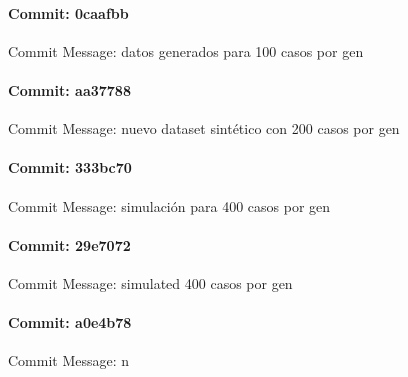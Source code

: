 \documentclass{article}
\begin{document}
\paragraph{Commit: 0caafbb}
Commit Message: datos generados para 100 casos por gen

\paragraph{Commit: aa37788}
Commit Message: nuevo dataset sintético con 200 casos por gen

\paragraph{Commit: 333bc70}
Commit Message: simulación para 400 casos por gen

\paragraph{Commit: 29e7072}
Commit Message: simulated 400 casos por gen

\paragraph{Commit: a0e4b78}
Commit Message: n

\end{document}

